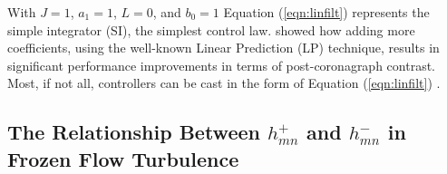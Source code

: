 \documentclass[10pt,preprint]{aastex631}
\begin{document}
With $J=1$, $a_1 = 1$, $L=0$, and $b_0 = 1$ Equation (\ref{eqn:linfilt}) represents the simple integrator (SI), the simplest control law.  \citet{2018JATIS...4a9001M} showed how adding more coefficients, using the well-known Linear Prediction (LP) technique, results in significant performance improvements in terms of post-coronagraph contrast.  Most, if not all, controllers can be cast in the form of Equation (\ref{eqn:linfilt}) \citep{2007JOSAA..24.2645P, 2021arXiv210307566H}. 



% 
% 
% 

\subsection{The Relationship Between $h_{mn}^+$ and $h_{mn}^-$ in Frozen Flow Turbulence}
\end{document}
